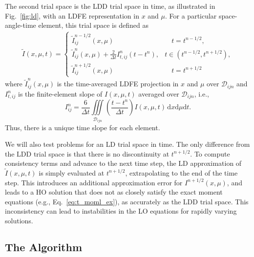 \documentclass{anstrans}
\renewcommand{\d}{\mathrm{d}}
\begin{document}
The second trial space is the LDD trial space in time, as illustrated in
Fig.~\ref{fig:ld}, with an LDFE representation in $x$ and $\mu$.  For a particular space-angle-time element, this trial space is defined as
\begin{multline}
\tilde I(x,\mu,t) = \left \{ \begin{array}{cl}
    \tilde I_{ij}^{n-1/2}(x,\mu) &  \quad t=t^{n-1/2}, \\
    \tilde I_{ij}^n(x,\mu) + \frac{2}{\Delta t}I_{t,ij}^n\left(t-t^{n}\right), &
          t\in (t^{n-1/2},t^{n+1/2}), \\
          \tilde I_{ij}^{n+1/2}(x,\mu) & \quad t=t^{n+1/2}
\end{array}
    \right.
\end{multline}
where  $\tilde I_{ij}^n(x,\mu)$ is the time-averaged LDFE projection in $x$ and $\mu$ over
$\mathcal{D}_{ijn}$ and $I^n_{t,ij}$ is the finite-element slope of $I(x,\mu,t)$ averaged over $\mathcal{D}_{ijn}$,
i.e.,
\begin{equation}\label{eq:tslope}
    I_{ij}^n = \frac{6}{\Delta t} \iiint\limits_{\mathcal{D}_{ijn}} \left( \frac{t - t^{n}}{\Delta
    t} \right) I(x,\mu,t) \,\d x \d \mu \d t.
\end{equation}
Thus, there is a unique time slope for each element.

We will also test problems for an LD trial space in time.  The only difference
from the LDD trial space is that there is no discontinuity at $t^{n+1/2}$. 
To compute consistency terms and advance to the
next time step, the LD approximation of $\tilde
I(x,\mu,t)$ is simply evaluated at $t^{n+1/2}$, extrapolating to the end of the time step. This
introduces an additional approximation error for $I^{n+1/2}(x,\mu)$, and leads to a HO solution that does not as closely
satisfy the exact moment equations (e.g., Eq.~\eqref{eq:t_moml_ex}), as accurately as the LDD trial space.  This
inconsistency can lead to instabilities in the LO equations for rapidly varying solutions. 



\subsection{The Algorithm}
\end{document}
